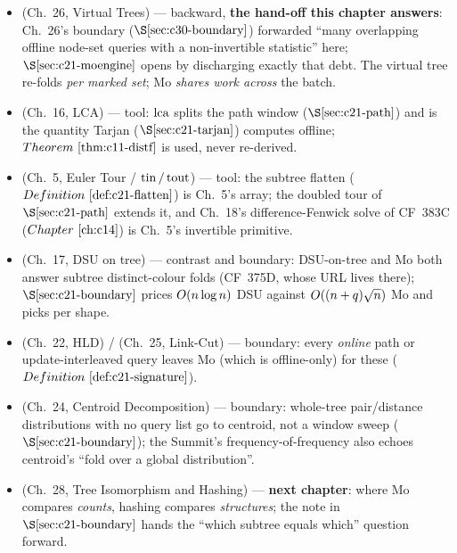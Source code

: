 
\begin{itemize}[nosep, leftmargin=1.4em]
  \item {} (Ch.~26, Virtual Trees) --- backward, \textbf{the hand-off this chapter
        answers}: Ch.~26's boundary (\(\secref{c30-boundary}\)) forwarded ``many overlapping
        offline node-set queries with a non-invertible statistic'' here; \(\secref{c21-moengine}\)
        opens by discharging exactly that debt. The virtual tree re-folds \emph{per marked
        set}; Mo \emph{shares work across} the batch.
  \item {} (Ch.~16, LCA) --- tool: \(\operatorname{lca}\) splits the path window (\(\secref{c21-path}\))
        and is the quantity Tarjan (\(\secref{c21-tarjan}\)) computes offline; \(\thmref{c11-distf}\)
        is used, never re-derived.
  \item {} (Ch.~5, Euler Tour / \(\operatorname{tin}/\operatorname{tout}\)) --- tool: the subtree flatten
        (\(\defref{c21-flatten}\)) is Ch.~5's array; the doubled tour of \(\secref{c21-path}\)
        extends it, and Ch.~18's difference-Fenwick solve of CF~383C
        (\(\chref{c14}\)) is Ch.~5's invertible primitive.
  \item {} (Ch.~17, DSU on tree) --- contrast and boundary: DSU-on-tree and Mo both
        answer subtree distinct-colour folds (CF~375D, whose URL lives there); \(\secref{c21-boundary}\)
        prices \(O(n\log n)\) DSU against \(O((n+q)\sqrt n)\) Mo and picks per shape.
  \item {} (Ch.~22, HLD) /  (Ch.~25, Link-Cut) --- boundary: every
        \emph{online} path or update-interleaved query leaves Mo (which is offline-only)
        for these (\(\defref{c21-signature}\)).
  \item {} (Ch.~24, Centroid Decomposition) --- boundary: whole-tree pair/distance
        distributions with no query list go to centroid, not a window sweep
        (\(\secref{c21-boundary}\)); the Summit's frequency-of-frequency also echoes centroid's
        ``fold over a global distribution''.
  \item {} (Ch.~28, Tree Isomorphism and Hashing) --- \textbf{next chapter}: where Mo
        compares \emph{counts}, hashing compares \emph{structures}; the note in
        \(\secref{c21-boundary}\) hands the ``which subtree equals which'' question forward.
\end{itemize}

